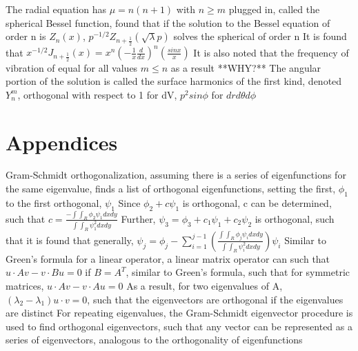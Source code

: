 \documentclass[11 pt, twoside]{article}
\newenvironment{outline*}
{
	\begin{outline}[enumerate]
	}
	{\end{outline}
}
\begin{document}
\begin{outline*}
	\2 The radial equation has $\mu = n(n + 1)$ with $n \geq m$ plugged in, called the spherical Bessel function, found that if the solution to the Bessel equation of order n is $Z_n(x)$, $p^{-1/2}Z_{n + \frac{1}{2}}(\sqrt{\lambda}p)$ solves the spherical of order n
		\3 It is found that $x^{-1/2}J_{n + \frac{1}{2}}(x) = x^n(-\frac{1}{x}\frac{d}{dx})^n(\frac{sinx}{x})$
		\3 It is also noted that the frequency of vibration of equal for all values $m \leq n$ as a result **WHY?**
	\2 The angular portion of the solution is called the surface harmonics of the first kind, denoted $Y^m_n$, orthogonal with respect to 1 for dV, $p^2sin\phi$ for $drd\theta d\phi$
\end{outline*}
\section{Appendices}
\begin{outline*}
\1 Gram-Schmidt orthogonalization, assuming there is a series of eigenfunctions for the same eigenvalue, finds a list of orthogonal eigenfunctions, setting the first, $\phi_1$ to the first orthogonal, $\psi_1$
	\2 Since $\phi_2 + c\psi_1$ is orthogonal, c can be determined, such that $c = \frac{-\int \int_R \phi_2 \psi_1 dxdy}{\int \int_R \psi_1^2 dxdy}$
	\2 Further, $\psi_3 = \phi_3 + c_1\psi_1 + c_2\psi_2$ is orthogonal, such that it is found that generally, $\psi_j = \phi_j - \sum_{i = 1}^{j - 1} (\frac{\int\int_R \phi_j \psi_i dxdy}{\int\int_R \psi_i^2 dxdy})\psi_i$
\1 Similar to Green's formula for a linear operator, a linear matrix operator can such that $u \cdot Av - v \cdot Bu = 0$ if $B = A^T$, similar to Green's formula, such that for symmetric matrices, $u \cdot Av - v \cdot Au = 0$
	\2 As a result, for two eigenvalues of A, $(\lambda_2 - \lambda_1) u \cdot v = 0$, such that the eigenvectors are orthogonal if the eigenvalues are distinct
	\2 For repeating eigenvalues, the Gram-Schmidt eigenvector procedure is used to find orthogonal eigenvectors, such that any vector can be represented as a series of eigenvectors, analogous to the orthogonality of eigenfunctions
\end{outline*}
\end{document}
